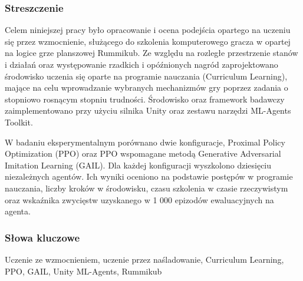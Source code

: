 \subsubsection*{Streszczenie} 
\begin{otherlanguage}{polish}
Celem niniejszej pracy było opracowanie i ocena podejścia opartego na uczeniu się przez wzmocnienie, służącego do szkolenia komputerowego gracza w opartej na logice grze planszowej Rummikub. Ze względu na rozległe przestrzenie stanów i działań oraz występowanie rzadkich i opóźnionych nagród zaprojektowano środowisko uczenia się oparte na programie nauczania (Curriculum Learning), mające na celu wprowadzanie wybranych mechanizmów gry poprzez zadania o stopniowo rosnącym stopniu trudności. Środowisko oraz framework badawczy zaimplementowano przy użyciu silnika Unity oraz zestawu narzędzi ML-Agents Toolkit.

W badaniu eksperymentalnym porównano dwie konfiguracje, Proximal Policy Optimization (PPO) oraz PPO wspomagane metodą Generative Adversarial Imitation Learning (GAIL). Dla każdej konfiguracji wyszkolono dziesięciu niezależnych agentów. Ich wyniki oceniono na podstawie postępów w programie nauczania, liczby kroków w środowisku, czasu szkolenia w czasie rzeczywistym oraz wskaźnika zwycięstw uzyskanego w 1 000 epizodów ewaluacyjnych na agenta.
\end{otherlanguage}

\subsubsection*{Słowa kluczowe} 
\begin{otherlanguage}{polish}
Uczenie ze wzmocnieniem, uczenie przez naśladowanie, Curriculum Learning, PPO, GAIL, Unity ML-Agents, Rummikub
\end{otherlanguage}

